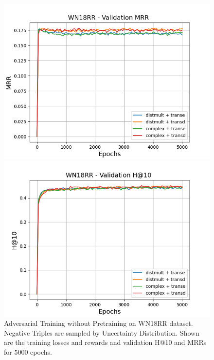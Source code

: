 \begin{figure}
\begin{minipage}{.5\textwidth}
    \end{minipage}
    \begin{minipage}{.5\textwidth}
      \centering
      \includegraphics[width=0.9\linewidth]{figures/results/gan_train/not_pretrained/uncertainty/max_distribution/entropy/wn18rr/gan_train_uncertainty_wn18rr_mrrs.png}
    \end{minipage}%
    \begin{minipage}{.5\textwidth}
      \centering
      \includegraphics[width=0.9\linewidth]{figures/results/gan_train/not_pretrained/uncertainty/max_distribution/entropy/wn18rr/gan_train_uncertainty_wn18rr_hit10s.png}
    \end{minipage}%
    \caption{Adversarial Training without Pretraining on \textsc{WN18RR} dataset. 
    Negative Triples are sampled by Uncertainty Distribution.
    Shown are the training losses and rewards and validation H@10 and MRRs for 5000 epochs.}
    \label{fig:advtrain_not_pretrained_wn18rr_pretrained}
\end{figure}





